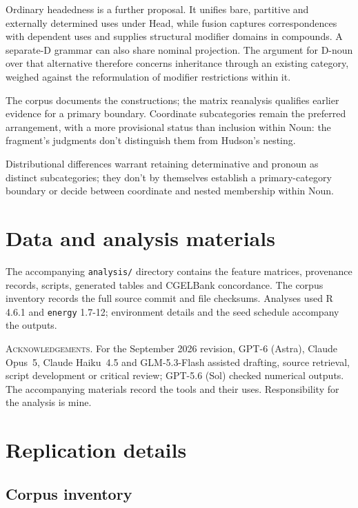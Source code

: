\documentclass[12pt]{article}
\begin{document}
Ordinary headedness is a further proposal. It unifies bare, partitive and externally determined uses under Head, while fusion captures correspondences with dependent uses and supplies structural modifier domains in compounds. A separate-D grammar can also share nominal projection. The argument for D-noun over that alternative therefore concerns inheritance through an existing category, weighed against the reformulation of modifier restrictions within it.

The corpus documents the constructions; the matrix reanalysis qualifies earlier evidence for a primary boundary. Coordinate subcategories remain the preferred arrangement, with a more provisional status than inclusion within Noun: the fragment's judgments don't distinguish them from Hudson's nesting.

Distributional differences warrant retaining determinative and pronoun as distinct subcategories; they don't by themselves establish a primary-category boundary or decide between coordinate and nested membership within Noun.

\section*{Data and analysis materials}

The accompanying \texttt{analysis/} directory contains the feature matrices, provenance records, scripts, generated tables and CGELBank concordance. The corpus inventory records the full source commit and file checksums. Analyses used R 4.6.1 and \texttt{energy} 1.7-12; environment details and the seed schedule accompany the outputs.

\vspace{0.5\baselineskip}
\noindent\textsc{Acknowledgements.} For the September 2026 revision, GPT-6 (Astra), Claude Opus~5, Claude Haiku~4.5 and GLM-5.3-Flash assisted drafting, source retrieval, script development or critical review; GPT-5.6 (Sol) checked numerical outputs. The accompanying materials record the tools and their uses. Responsibility for the analysis is mine.

\appendix
\section{Replication details}\label{app:replication}

\subsection{Corpus inventory}
\end{document}
